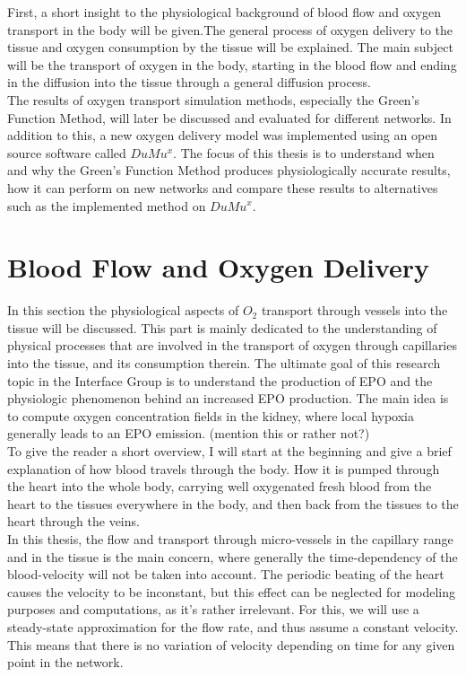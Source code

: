 First, a short insight to the physiological background of blood flow and oxygen transport in the body will be given.The general process of oxygen delivery to the tissue and oxygen consumption by the tissue will be explained. The main subject will be the transport of oxygen in the body, starting in the blood flow and ending in the diffusion into the tissue through a general diffusion process.
\\The results of oxygen transport simulation methods, especially the Green's Function Method, will later be discussed and evaluated for different networks. In addition to this, a new oxygen delivery model was implemented using an open source software called $DuMu^x$. The focus of this thesis is to understand when and why the Green's Function Method produces physiologically accurate results, how it can perform on new networks and compare these results to alternatives such as the implemented method on $DuMu^x$.

\newpage
\section{Blood Flow and Oxygen Delivery}

In this section the physiological aspects of $O_2$ transport through vessels into the tissue will be discussed. This part is mainly dedicated to the understanding of physical processes that are involved in the transport of oxygen through capillaries into the tissue, and its consumption therein. The ultimate goal of this research topic in the Interface Group is to understand the production of EPO and the physiologic phenomenon behind an increased EPO production. The main idea is to compute oxygen concentration fields in the kidney, where local hypoxia generally leads to an EPO emission. ({\color{red}mention this or rather not?})
\\To give the reader a short overview, I will start at the beginning and give a brief explanation of how blood travels through the body. How it is pumped through the heart into the whole body, carrying well oxygenated fresh blood from the heart to the tissues everywhere in the body, and then back from the tissues to the heart through the veins.
\\In this thesis, the flow and transport through micro-vessels in the capillary range and in the tissue is the main concern, where generally the time-dependency of the blood-velocity will not be taken into account. The periodic beating of the heart causes the velocity to be inconstant, but this effect can be neglected for modeling purposes and computations, as it's rather irrelevant. For this, we will use a steady-state approximation for the flow rate, and thus assume a constant velocity. This means that there is no variation of velocity depending on time for any given point in the network.

